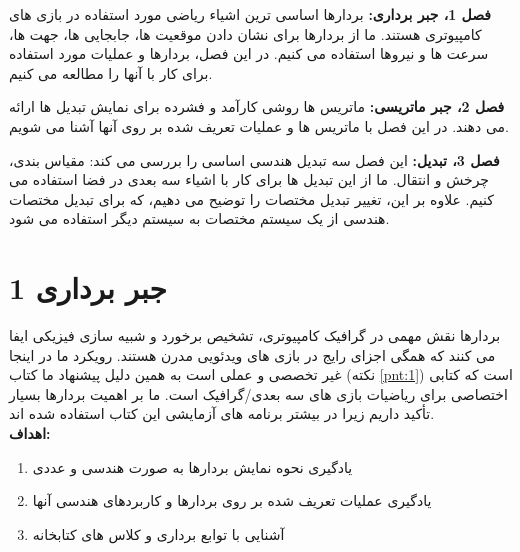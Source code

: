 {\begin{spacing}{1.4}
        \textbf{فصل 1، جبر برداری:} بردارها اساسی ترین اشیاء ریاضی مورد استفاده در بازی های کامپیوتری هستند.
        ما از بردارها برای نشان دادن موقعیت ها، جابجایی ها، جهت ها، سرعت ها و نیروها استفاده می کنیم.
        در این فصل، بردارها و عملیات مورد استفاده برای کار با آنها را مطالعه می کنیم.

        \textbf{فصل 2، جبر ماتریسی:} ماتریس ها روشی کارآمد و فشرده برای نمایش تبدیل ها ارائه می دهند.
        در این فصل با ماتریس ها و عملیات تعریف شده بر روی آنها آشنا می شویم.

        \textbf{فصل 3، تبدیل:} این فصل سه تبدیل هندسی اساسی را بررسی می کند: مقیاس بندی، چرخش و انتقال.
        ما از این تبدیل ها برای کار با اشیاء سه بعدی در فضا استفاده می کنیم.
        علاوه بر این، تغییر تبدیل مختصات را توضیح می دهیم، که برای تبدیل مختصات هندسی از یک سیستم مختصات به سیستم دیگر استفاده می شود.
    \end{spacing}
}

\setcounter{chapter}{1}

\textbf{\vspace{80pt}}


\chapter{\textbf{1 جبر برداری}}
\textbf{\vspace{70pt}}
{
    \Large
    \begin{spacing}{1.5}
        بردارها نقش مهمی در گرافیک کامپیوتری، تشخیص برخورد و شبیه سازی فیزیکی ایفا می کنند که همگی اجزای رایج در بازی های ویدئویی مدرن هستند.
        رویکرد ما در اینجا غیر تخصصی و عملی است به همین دلیل پیشنهاد ما کتاب  (نکته \ref{pnt:1}) است که کتابی اختصاصی برای ریاضیات بازی های سه بعدی/گرافیک است.
        ما بر اهمیت بردارها بسیار تأکید داریم زیرا در بیشتر برنامه های آزمایشی این کتاب استفاده شده اند.
        \\

        \textbf{\LARGE \hspace{-40pt}اهداف:}
        \begin{enumerate}[label=\textbf{\arabic*}.]
            \item {یادگیری نحوه نمایش بردارها به صورت هندسی و عددی}
            \item {یادگیری عملیات تعریف شده بر روی بردارها و کاربردهای هندسی آنها}
            \item {آشنایی با توابع برداری و کلاس های کتابخانه }
        \end{enumerate}
    \end{spacing}
}
\newpage

